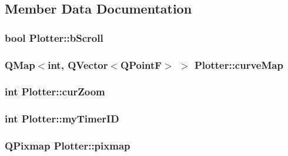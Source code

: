\subsection{\-Member \-Data \-Documentation}
\hypertarget{class_plotter_ae4a2f9fec7b69141f70bbcf548f25427}{
\subsubsection[{b\-Scroll}]{\setlength{\rightskip}{0pt plus 5cm}bool {\bf \-Plotter\-::b\-Scroll}}}\label{class_plotter_ae4a2f9fec7b69141f70bbcf548f25427}
\hypertarget{class_plotter_af35afcf49655837b654c631b85443665}{
\subsubsection[{curve\-Map}]{\setlength{\rightskip}{0pt plus 5cm}\-Q\-Map$<$int, \-Q\-Vector$<$\-Q\-Point\-F$>$ $>$ {\bf \-Plotter\-::curve\-Map}}}\label{class_plotter_af35afcf49655837b654c631b85443665}
\hypertarget{class_plotter_aad79a663e9f42f43a824be11069e00de}{
\subsubsection[{cur\-Zoom}]{\setlength{\rightskip}{0pt plus 5cm}int {\bf \-Plotter\-::cur\-Zoom}}}\label{class_plotter_aad79a663e9f42f43a824be11069e00de}
\hypertarget{class_plotter_a5984542f00fe574aaf1bf6fbdbd7428a}{
\subsubsection[{my\-Timer\-I\-D}]{\setlength{\rightskip}{0pt plus 5cm}int {\bf \-Plotter\-::my\-Timer\-I\-D}}}\label{class_plotter_a5984542f00fe574aaf1bf6fbdbd7428a}
\hypertarget{class_plotter_a9fb6f7f3af672b4d8bc43a4e1f7fbbbc}{
\subsubsection[{pixmap}]{\setlength{\rightskip}{0pt plus 5cm}\-Q\-Pixmap {\bf \-Plotter\-::pixmap}}}\label{class_plotter_a9fb6f7f3af672b4d8bc43a4e1f7fbbbc}
